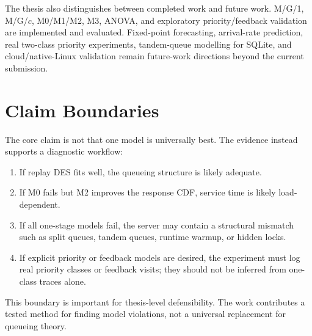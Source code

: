 The thesis also distinguishes between completed work and future work. M/G/1, M/G/$c$, M0/M1/M2, M3, ANOVA, and exploratory priority/feedback validation are implemented and evaluated. Fixed-point forecasting, arrival-rate prediction, real two-class priority experiments, tandem-queue modelling for SQLite, and cloud/native-Linux validation remain future-work directions beyond the current submission.

\section{Claim Boundaries}

The core claim is not that one model is universally best. The evidence instead supports a diagnostic workflow:

\begin{enumerate}
    \item If replay DES fits well, the queueing structure is likely adequate.
    \item If M0 fails but M2 improves the response CDF, service time is likely load-dependent.
    \item If all one-stage models fail, the server may contain a structural mismatch such as split queues, tandem queues, runtime warmup, or hidden locks.
    \item If explicit priority or feedback models are desired, the experiment must log real priority classes or feedback visits; they should not be inferred from one-class traces alone.
\end{enumerate}

This boundary is important for thesis-level defensibility. The work contributes a tested method for finding model violations, not a universal replacement for queueing theory.
